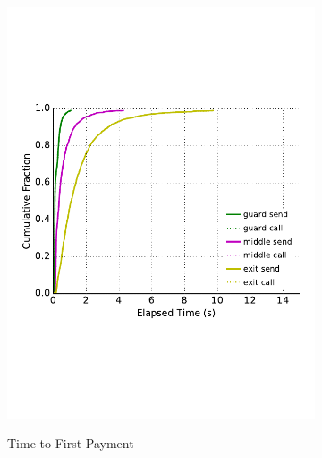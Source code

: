 \begin{figure}
\begin{subfigure}[t]{0.32\textwidth}
\includegraphics[trim={0 3cm 0 3cm}, clip, width=1.0\textwidth]{images/payment_pay.pdf}
		\label{fig:stats_b}
		\caption{Time to First Payment}
	\end{subfigure}
	\begin{subfigure}[t]{0.32\textwidth} \centering

\end{subfigure}
\end{figure}
